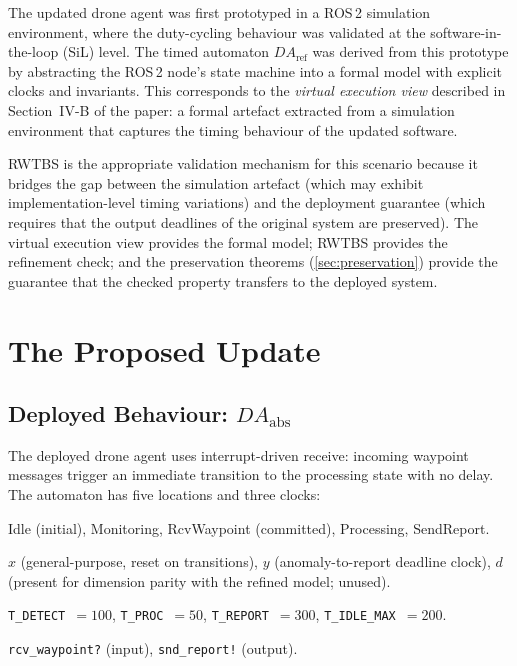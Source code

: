 \documentclass[11pt,a4paper]{article}
\newcommand{\DAabs}{\mathit{DA}_{\mathrm{abs}}}
\newcommand{\DAref}{\mathit{DA}_{\mathrm{ref}}}
\newcommand{\RWTBS}{RWTBS}
\begin{document}
The updated drone agent was first prototyped in a ROS\,2 simulation
environment, where the duty-cycling behaviour was validated at the
software-in-the-loop (SiL) level.  The timed automaton $\DAref$ was derived
from this prototype by abstracting the ROS\,2 node's state machine into a
formal model with explicit clocks and invariants.  This corresponds to the
\emph{virtual execution view} described in Section~IV-B of the paper: a formal
artefact extracted from a simulation environment that captures the timing
behaviour of the updated software.

\RWTBS{} is the appropriate validation mechanism for this scenario because it
bridges the gap between the simulation artefact (which may exhibit
implementation-level timing variations) and the deployment guarantee (which
requires that the output deadlines of the original system are preserved).  The
virtual execution view provides the formal model; \RWTBS{} provides the
refinement check; and the preservation theorems (\cref{sec:preservation})
provide the guarantee that the checked property transfers to the deployed
system.

\section{The Proposed Update}
\label{sec:update}

\subsection{Deployed Behaviour: \texorpdfstring{$\DAabs$}{DA\_abs}}
\label{sec:da-abstract}

The deployed drone agent uses interrupt-driven receive: incoming waypoint
messages trigger an immediate transition to the processing state with no
delay.  The automaton has five locations and three clocks:

\begin{description}[nosep,leftmargin=1.5em]
  \item[Locations:] \textsf{Idle} (initial), \textsf{Monitoring},
    \textsf{RcvWaypoint} (committed), \textsf{Processing}, \textsf{SendReport}.
  \item[Clocks:] $x$ (general-purpose, reset on transitions), $y$
    (anomaly-to-report deadline clock), $d$ (present for dimension parity with
    the refined model; unused).
  \item[Key constants:] \texttt{T\_DETECT}~$= 100$,
    \texttt{T\_PROC}~$= 50$, \texttt{T\_REPORT}~$= 300$,
    \texttt{T\_IDLE\_MAX}~$= 200$.
  \item[Channels:] \texttt{rcv\_waypoint?} (input), \texttt{snd\_report!}
    (output).
\end{description}
\end{document}
